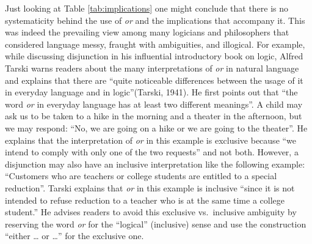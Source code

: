 \documentclass[oneside]{report}
\theoremstyle{definition}
\theoremstyle{definition}
\theoremstyle{definition}
\theoremstyle{remark}
\begin{document}
Just looking at Table \ref{tab:implications} one might conclude that
there is no systematicity behind the use of \emph{or} and the
implications that accompany it. This was indeed the prevailing view
among many logicians and philosophers that considered language messy,
fraught with ambiguities, and illogical. For example, while discussing
disjunction in his influential introductory book on logic, Alfred Tarski
warns readers about the many interpretations of \emph{or} in natural
language and explains that there are ``quite noticeable differences
between the usage of it in everyday language and in logic''(Tarski,
1941). He first points out that ``the word \emph{or} in everyday
language has at least two different meanings''. A child may ask us to be
taken to a hike in the morning and a theater in the afternoon, but we
may respond: ``No, we are going on a hike or we are going to the
theater''. He explains that the interpretation of \emph{or} in this
example is exclusive because ``we intend to comply with only one of the
two requests'' and not both. However, a disjunction may also have an
inclusive interpretation like the following example: ``Customers who are
teachers or college students are entitled to a special reduction''.
Tarski explains that \emph{or} in this example is inclusive ``since it
is not intended to refuse reduction to a teacher who is at the same time
a college student.'' He advises readers to avoid this exclusive
vs.~inclusive ambiguity by reserving the word \emph{or} for the
``logical'' (inclusive) sense and use the construction ``either \ldots{}
or \ldots{}'' for the exclusive one.
\end{document}

